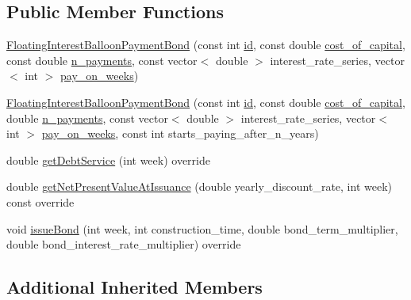 \subsection*{Public Member Functions}
\begin{DoxyCompactItemize}
\item 
\mbox{\hyperlink{classFloatingInterestBalloonPaymentBond_aa42f50447a3dd1bd6959e8c4bd0c2421}{Floating\+Interest\+Balloon\+Payment\+Bond}} (const int \mbox{\hyperlink{classBond_a7f75bcafbc16676ad6dbafbf40afae4a}{id}}, const double \mbox{\hyperlink{classBond_ad98df7d28b398e620286f95ee085439b}{cost\+\_\+of\+\_\+capital}}, const double \mbox{\hyperlink{classBond_a4a227b6de2eeada118d82ab1633b1db8}{n\+\_\+payments}}, const vector$<$ double $>$ interest\+\_\+rate\+\_\+series, vector$<$ int $>$ \mbox{\hyperlink{classBond_ae8dd46fcbf95c993460ffe4ea1f52739}{pay\+\_\+on\+\_\+weeks}})
\item 
\mbox{\hyperlink{classFloatingInterestBalloonPaymentBond_a9732cbf82ecc484237071bb681f7dc63}{Floating\+Interest\+Balloon\+Payment\+Bond}} (const int \mbox{\hyperlink{classBond_a7f75bcafbc16676ad6dbafbf40afae4a}{id}}, const double \mbox{\hyperlink{classBond_ad98df7d28b398e620286f95ee085439b}{cost\+\_\+of\+\_\+capital}}, double \mbox{\hyperlink{classBond_a4a227b6de2eeada118d82ab1633b1db8}{n\+\_\+payments}}, const vector$<$ double $>$ interest\+\_\+rate\+\_\+series, vector$<$ int $>$ \mbox{\hyperlink{classBond_ae8dd46fcbf95c993460ffe4ea1f52739}{pay\+\_\+on\+\_\+weeks}}, const int starts\+\_\+paying\+\_\+after\+\_\+n\+\_\+years)
\item 
double \mbox{\hyperlink{classFloatingInterestBalloonPaymentBond_a0009a0b12e0ebeb15952561513ddc901}{get\+Debt\+Service}} (int week) override
\item 
double \mbox{\hyperlink{classFloatingInterestBalloonPaymentBond_a90205e26e09eef1227f8c0671ca4fce2}{get\+Net\+Present\+Value\+At\+Issuance}} (double yearly\+\_\+discount\+\_\+rate, int week) const override
\item 
void \mbox{\hyperlink{classFloatingInterestBalloonPaymentBond_a4cf110f320c92f5eca9aed952e0b527a}{issue\+Bond}} (int week, int construction\+\_\+time, double bond\+\_\+term\+\_\+multiplier, double bond\+\_\+interest\+\_\+rate\+\_\+multiplier) override
\end{DoxyCompactItemize}
\subsection*{Additional Inherited Members}


